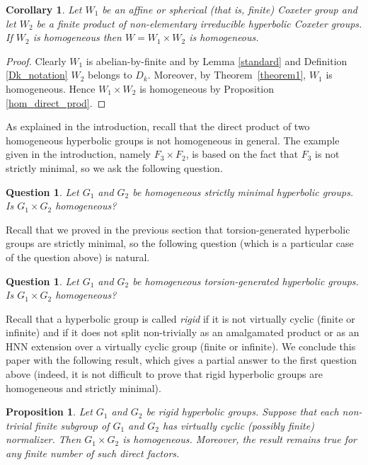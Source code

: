 \documentclass[a4paper, 11pt]{amsart}
\newtheorem{prop}[te]{Proposition}
\newtheorem{co}[te]{Corollary}
\newtheorem{qu}[te]{Question}
\theoremstyle{definition}
\theoremstyle{remark}
\begin{document}
\begin{co}\label{final_co} Let $W_1$ be an affine or spherical (that is, finite) Coxeter group and let $W_2$ be a finite product of non-elementary irreducible hyperbolic Coxeter groups. If $W_2$ is homogeneous then $W = W_1 \times W_2$ is homogeneous.
\end{co}

\begin{proof} Clearly $W_1$ is abelian-by-finite and by Lemma \ref{standard} and Definition \ref{Dk_notation} $W_2$ belongs to $D_k$. Moreover, by Theorem~\ref{theorem1}, $W_1$ is homogeneous. Hence $W_1\times W_2$ is homogeneous by Proposition \ref{hom_direct_prod}.
\end{proof}

As explained in the introduction, recall that the direct product of two homogeneous hyperbolic groups is not homogeneous in general. The example given in the introduction, namely $F_3\times F_2$, is based on the fact that $F_3$ is not strictly minimal, so we ask the following question.

\begin{qu}Let $G_1$ and $G_2$ be homogeneous strictly minimal hyperbolic groups. Is $G_1\times G_2$ homogeneous?
\end{qu}

Recall that we proved in the previous section that torsion-generated hyperbolic groups are strictly minimal, so the following question (which is a particular case of the question above) is natural.

\begin{qu}Let $G_1$ and $G_2$ be homogeneous torsion-generated hyperbolic groups. Is $G_1\times G_2$ homogeneous?
\end{qu}

Recall that a hyperbolic group is called \emph{rigid} if it is not virtually cyclic (finite or infinite) and if it does not split non-trivially as an amalgamated product or as an HNN extension over a virtually cyclic group (finite or infinite). We conclude this paper with the following result, which gives a partial answer to the first question above (indeed, it is not difficult to prove that rigid hyperbolic groups are homogeneous and strictly minimal).

\begin{prop}\label{prod_rig_hyp}
Let $G_1$ and $G_2$ be rigid hyperbolic groups. Suppose that each non-trivial finite subgroup of $G_1$ and $G_2$ has virtually cyclic (possibly finite) normalizer. Then $G_1\times G_2$ is homogeneous. Moreover, the result remains true for any finite number of such direct factors. 
\end{prop}
\end{document}
